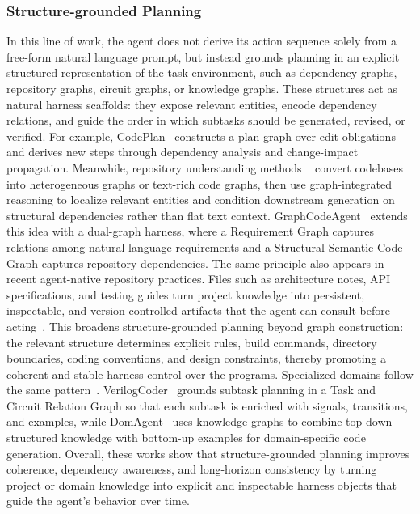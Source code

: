 \documentclass{llmxive}
\begin{document}
\subsubsection{Structure-grounded Planning}
In this line of work, the agent does not derive its action sequence solely from a free-form natural language prompt, but instead grounds planning in an explicit structured representation of the task environment, such as dependency graphs, repository graphs, circuit graphs, or knowledge graphs. These structures act as natural harness scaffolds: they expose relevant entities, encode dependency relations, and guide the order in which subtasks should be generated, revised, or verified. For example, CodePlan~\cite{bairi2024codeplan} constructs a plan graph over edit obligations and derives new steps through dependency analysis and change-impact propagation. Meanwhile, repository understanding methods ~\cite{luo2025rpg,chen2025locagent,tao2025cgm,luo2025rpg} convert codebases into heterogeneous graphs or text-rich code graphs, then use graph-integrated reasoning to localize relevant entities and condition downstream generation on structural dependencies rather than flat text context. GraphCodeAgent~\cite{li2025graphcodeagent} extends this idea with a dual-graph harness, where a Requirement Graph captures relations among natural-language requirements and a Structural-Semantic Code Graph captures repository dependencies. 
The same principle also appears in recent agent-native repository practices. Files such as architecture notes, API specifications, and testing guides turn project knowledge into persistent, inspectable, and version-controlled artifacts that the agent can consult before acting~\cite{agentsmd2025,openai2026agentsmd,anthropic2025claudememory}. This broadens structure-grounded planning beyond graph construction: the relevant structure determines explicit rules, build commands, directory boundaries, coding conventions, and design constraints, thereby promoting a coherent and stable harness control over the programs. 
Specialized domains follow the same pattern~\cite{wang2026domagent,ho2025verilogcoder}. VerilogCoder~\cite{ho2025verilogcoder} grounds subtask planning in a Task and Circuit Relation Graph so that each subtask is enriched with signals, transitions, and examples, while DomAgent~\cite{wang2026domagent} uses knowledge graphs to combine top-down structured knowledge with bottom-up examples for domain-specific code generation. Overall, these works show that structure-grounded planning improves coherence, dependency awareness, and long-horizon consistency by turning project or domain knowledge into explicit and inspectable harness objects that guide the agent's behavior over time.
\end{document}
